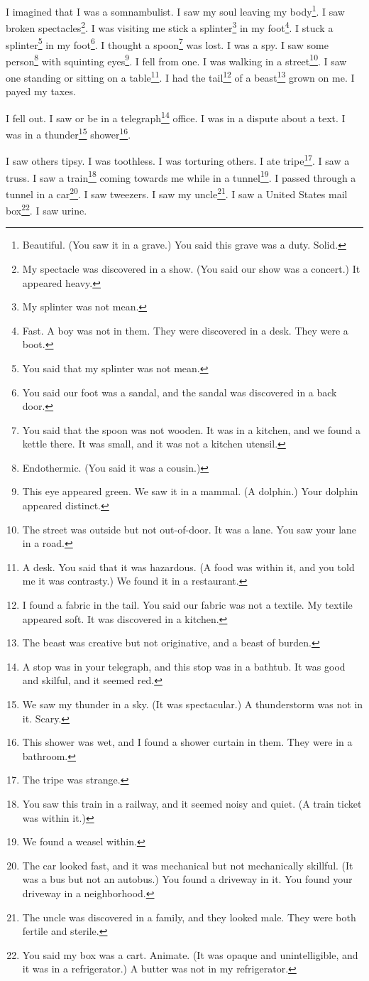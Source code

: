 \documentclass[12pt]{book}
\begin{document}
 I imagined that I was a somnambulist. I saw my soul leaving my body\footnote{Beautiful. (You saw it in a grave.) You said this grave was a duty. Solid.}. I saw broken spectacles\footnote{My spectacle was discovered in a show. (You said our show was a concert.) It appeared heavy.}. I was visiting me stick a splinter\footnote{My splinter was not mean.} in my foot\footnote{Fast. A boy was not in them. They were discovered in a desk. They were a boot.}. I stuck a splinter\footnote{You said that my splinter was not mean.} in my foot\footnote{You said our foot was a sandal, and the sandal was discovered in a back door.}. I thought a spoon\footnote{You said that the spoon was not wooden. It was in a kitchen, and we found a kettle there. It was small, and it was not a kitchen utensil.} was lost. I was a spy. I saw some person\footnote{Endothermic. (You said it was a cousin.)} with squinting eyes\footnote{This eye appeared green. We saw it in a mammal. (A dolphin.) Your dolphin appeared distinct.}. I fell from one. I was walking in a street\footnote{The street was outside but not out-of-door. It was a lane. You saw your lane in a road.}. I saw one standing or sitting on a table\footnote{A desk. You said that it was hazardous. (A food was within it, and you told me it was contrasty.) We found it in a restaurant.}. I had the tail\footnote{I found a fabric in the tail. You said our fabric was not a textile. My textile appeared soft. It was discovered in a kitchen.} of a beast\footnote{The beast was creative but not originative, and a beast of burden.} grown on me. I payed my taxes. 

 I fell out. I saw or be in a telegraph\footnote{A stop was in your telegraph, and this stop was in a bathtub. It was good and skilful, and it seemed red.} office. I was in a dispute about a text. I was in a thunder\footnote{We saw my thunder in a sky. (It was spectacular.) A thunderstorm was not in it. Scary.} shower\footnote{This shower was wet, and I found a shower curtain in them. They were in a bathroom.}. 

 I saw others tipsy. I was toothless. I was torturing others. I ate tripe\footnote{The tripe was strange.}. I saw a truss. I saw a train\footnote{You saw this train in a railway, and it seemed noisy and quiet. (A train ticket was within it.)} coming towards me while in a tunnel\footnote{We found a weasel within.}. I passed through a tunnel in a car\footnote{The car looked fast, and it was mechanical but not mechanically skillful. (It was a bus but not an autobus.) You found a driveway in it. You found your driveway in a neighborhood.}. I saw tweezers. I saw my uncle\footnote{The uncle was discovered in a family, and they looked male. They were both fertile and sterile.}. I saw a United States mail box\footnote{You said my box was a cart. Animate. (It was opaque and unintelligible, and it was in a refrigerator.) A butter was not in my refrigerator.}. I saw urine. 
\end{document}
